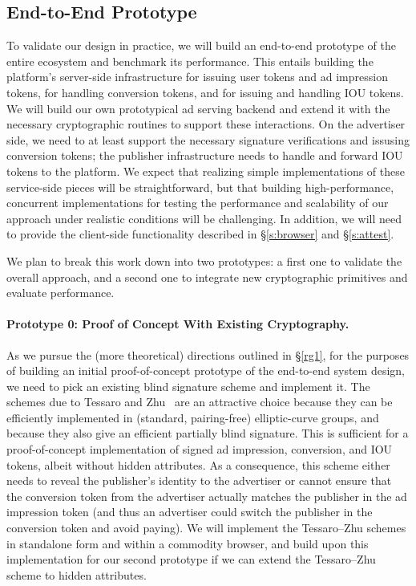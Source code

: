 \subsection{End-to-End Prototype}
%
To validate our design in practice, we will build an end-to-end prototype of the entire ecosystem and benchmark its performance.
%
This entails building the platform's server-side infrastructure for issuing user tokens and ad impression tokens, for handling conversion tokens, and for issuing and handling IOU tokens.
%
We will build our own prototypical ad serving backend and extend it with the necessary cryptographic routines to support these interactions.
%
On the advertiser side, we need to at least support the necessary signature verifications and issusing conversion tokens; the publisher infrastructure needs to handle and forward IOU tokens to the platform.
%
We expect that realizing simple implementations of these service-side pieces will be straightforward, but that building high-performance, concurrent implementations for testing the performance and scalability of our approach under realistic conditions will be challenging.
%
In addition, we will need to provide the client-side functionality described in \S\ref{s:browser} and \S\ref{s:attest}.
%

%
We plan to break this work down into two prototypes: a first one to validate the overall approach, and a second one to integrate new cryptographic primitives and evaluate performance.
%

\paragraph{Prototype 0: Proof of Concept With Existing Cryptography.}
%
As we pursue the (more theoretical) directions outlined in \S\ref{rg1}, for the purposes of building an initial proof-of-concept prototype of the end-to-end system design, we need to pick an existing blind signature scheme and implement it.
%
The schemes due to Tessaro and Zhu~\cite{EC:TesZhu22} are an attractive choice because they can be efficiently implemented in (standard, pairing-free) elliptic-curve groups, and because they also give an efficient partially blind signature.
%
This is sufficient for a proof-of-concept implementation of signed ad impression, conversion, and IOU tokens, albeit without hidden attributes.
%
As a consequence, this scheme either needs to reveal the publisher's identity to the advertiser or cannot ensure that the conversion token from the advertiser actually matches the publisher in the ad impression token (and thus an advertiser could switch the publisher in the conversion token and avoid paying).
%
We will implement the Tessaro--Zhu schemes in standalone form and within a commodity browser, and build upon this implementation for our second prototype if we can extend the Tessaro--Zhu scheme to hidden attributes.
%

